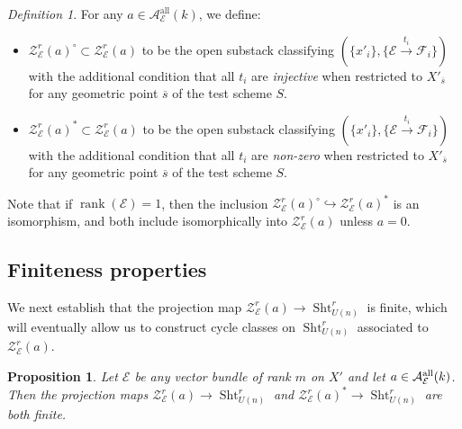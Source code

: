 \documentclass[reqno]{amsart}
\numberwithin{equation}{section}
\newcommand{\Cal}[1]{\mathcal{#1}}
\newcommand{\inj}{\hookrightarrow}
\DeclareMathOperator{\rank}{rank}
\DeclareMathOperator{\Sht}{Sht}
\DeclareMathOperator{\all}{all}
\newcommand{\ov}{\overline}
\newcommand\xr{\xrightarrow}
\newcommand\cA{\mathcal{A}}
\newcommand\cE{\mathcal{E}}
\newcommand\cF{\mathcal{F}}
\newcommand\cZ{\mathcal{Z}}
\newtheorem{prop}[thm]{Proposition}
\theoremstyle{remark}
\newtheorem{defn}[thm]{Definition}
\numberwithin{equation}{section}
\begin{document}
\begin{defn}\label{def:Z(0)}
For any $a \in \cA_{\cE}^{\all}(k)$, we define: 
\begin{itemize}
\item $\cZ_{\cE}^{r}(a)^{\circ}\subset\cZ^{r}_{\cE}(a)$ to be the open substack classifying $(\{x'_{i}\}, \{\cE\xr{t_{i}}\cF_{i}\})$ with the additional condition that all $t_{i}$ are \emph{injective} when restricted to $X'_{\ov s}$ for any geometric point $\ov s$ of the test scheme $S$. 
\item $\cZ_{\cE}^{r}(a)^{*}\subset\cZ^{r}_{\cE}(a)$ to be the open substack classifying $(\{x'_{i}\}, \{\cE\xr{t_{i}}\cF_{i}\})$ with the additional condition that all $t_{i}$ are \emph{non-zero} when restricted to $X'_{\ov s}$ for any geometric point $\ov s$ of the test scheme $S$.
\end{itemize}
Note that if $\rank(\cE)=1$, then the inclusion $\cZ_{\cE}^{r}(a)^{\circ} \inj \cZ_{\cE}^{r}(a)^{*}$ is an isomorphism, and both include isomorphically into $\cZ_{\cE}^r(a)$ unless $a=0$.
\end{defn}

\subsection{Finiteness properties} 

We next establish that the projection map $\Cal{Z}_{\Cal{E}}^{r}(a) \rightarrow \Sht_{U(n)}^{r}$ is finite, which will eventually allow us to construct cycle classes on $ \Sht_{U(n)}^{r}$ associated to $\Cal{Z}_{\Cal{E}}^{r}(a) $. 

\begin{prop}\label{prop: Z finite}
Let $\cE$ be any vector bundle of rank $m$ on $X'$ and let  $a \in \Cal{A}^{\rm all}_{\Cal{E}}(k)$. Then the projection maps $\Cal{Z}_{\Cal{E}}^{r}(a) \rightarrow \Sht_{U(n)}^{r}$ and $\Cal{Z}_{\Cal{E}}^{r}(a)^* \rightarrow \Sht_{U(n)}^{r}$ are both finite.
\end{prop}
\end{document}
